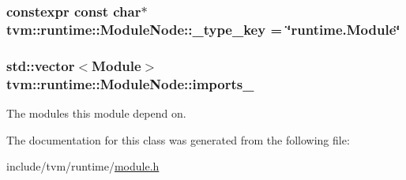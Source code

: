 \subsubsection[{\texorpdfstring{\+\_\+type\+\_\+key}{_type_key}}]{\setlength{\rightskip}{0pt plus 5cm}constexpr const char$\ast$ tvm\+::runtime\+::\+Module\+Node\+::\+\_\+type\+\_\+key = \char`\"{}runtime.\+Module\char`\"{}\hspace{0.3cm}{\ttfamily [static]}}\hypertarget{classtvm_1_1runtime_1_1ModuleNode_a9346e3758203ca87d500e65de0445e01}{}\label{classtvm_1_1runtime_1_1ModuleNode_a9346e3758203ca87d500e65de0445e01}
\subsubsection[{\texorpdfstring{imports\+\_\+}{imports_}}]{\setlength{\rightskip}{0pt plus 5cm}std\+::vector$<${\bf Module}$>$ tvm\+::runtime\+::\+Module\+Node\+::imports\+\_\+\hspace{0.3cm}{\ttfamily [protected]}}\hypertarget{classtvm_1_1runtime_1_1ModuleNode_af05db5c6d76f9b4dbf0631815170c5a7}{}\label{classtvm_1_1runtime_1_1ModuleNode_af05db5c6d76f9b4dbf0631815170c5a7}


The modules this module depend on. 



The documentation for this class was generated from the following file\+:\begin{DoxyCompactItemize}
\item 
include/tvm/runtime/\hyperlink{runtime_2module_8h}{module.\+h}\end{DoxyCompactItemize}
